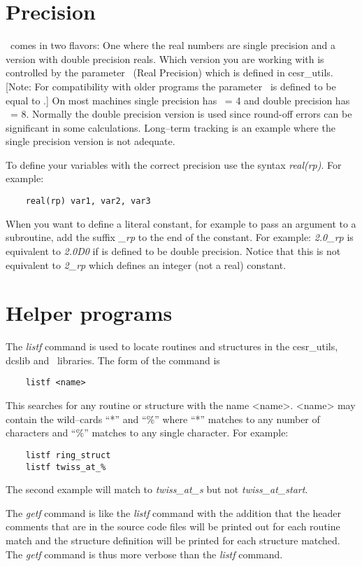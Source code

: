 \documentclass{book}
\begin{document}
\section{Precision}

\bmad\ comes in two flavors: One where the real numbers are single
precision and a version with double precision reals. Which version you
are working with is controlled by the parameter \rp\ (Real Precision)
which is defined in cesr\_utils. [Note: For compatibility with older
programs the parameter \rdef\ is defined to be equal to \rp.]  On most
machines single precision has \rp\ = 4 and double precision has \rp\ =
8. Normally the double precision version is used since round-off
errors can be significant in some calculations. Long--term tracking is
an example where the single precision version is not adequate. 

To define your variables with the correct precision use the syntax
{\it real(rp)}. For example:
\begin{verbatim}
    real(rp) var1, var2, var3
\end{verbatim}
When you want to define a literal constant, for example to pass an
argument to a subroutine, add the suffix {\it \_rp} to the end of the
constant. For example: {\it 2.0\_rp} is equivalent to {\it 2.0D0} if
\rp is defined to be double precision. Notice that this is not
equivalent to {\it 2\_rp} which defines an integer (not a real) constant.


\section{Helper programs}

The {\it listf} command is used to locate routines and structures in
the cesr\_utils, dcslib and \bmad\ libraries. The form of the command is
\begin{verbatim}
    listf <name>
\end{verbatim}
This searches for any routine or structure with the name
<name>. <name> may contain the wild--cards ``*'' and ``\%'' where
``*'' matches to any number of characters and ``\%'' matches to any
single character. For example:
\begin{verbatim}
    listf ring_struct
    listf twiss_at_%
\end{verbatim}
The second example will match to {\it twiss\_at\_s} but not {\sl
twiss\_at\_start}.

The {\it getf} command is like the {\it listf} command with the
addition that the header comments that are in the source code files
will be printed out for each routine match and the structure definition
will be printed for each structure matched. The {\it getf} command is
thus more verbose than the {\it listf} command.
\end{document}
